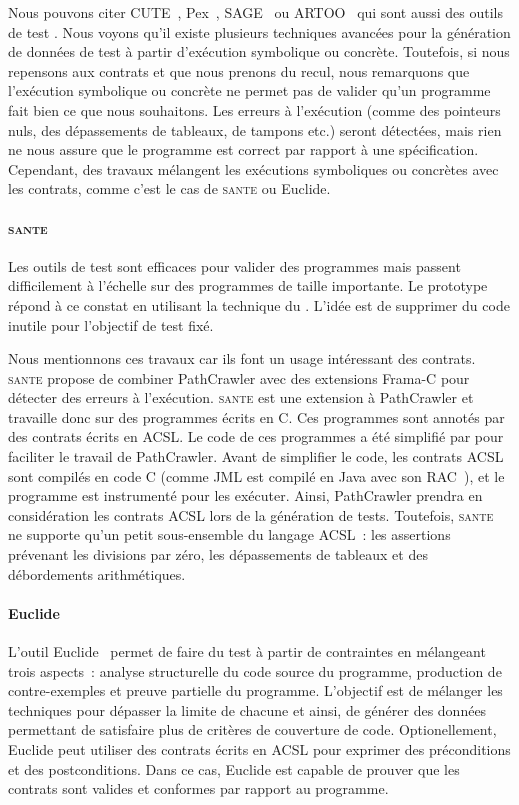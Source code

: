 Nous pouvons citer CUTE~, Pex~,
SAGE~ ou ARTOO~ qui sont aussi des outils
de test . Nous voyons qu'il existe plusieurs techniques
avancées pour la génération de données de test à partir d'exécution symbolique
ou concrète. Toutefois, si nous repensons aux contrats et que nous prenons du
recul, nous remarquons que l'exécution symbolique ou concrète ne permet pas de
valider qu'un programme fait bien ce que nous souhaitons. Les erreurs à
l'exécution (comme des pointeurs nuls, des dépassements de tableaux, de tampons
etc.) seront détectées, mais rien ne nous assure que le programme est correct
par rapport à une spécification. Cependant, des travaux mélangent les exécutions
symboliques ou concrètes avec les contrats, comme c'est le cas de {\scshape
sante} ou Euclide.

\paragraph{\scshape sante} Les outils de test  sont
efficaces pour valider des programmes mais passent difficilement à l'échelle sur
des programmes de taille importante. Le prototype~~ répond à ce constat en utilisant la technique du
. L'idée est de supprimer du code inutile pour l'objectif de
test fixé.

Nous mentionnons ces travaux car ils font un usage intéressant des contrats.
{\scshape sante} propose de combiner PathCrawler avec des extensions Frama-C
pour détecter des erreurs à l'exécution. {\scshape sante} est une extension à
PathCrawler et travaille donc sur des programmes écrits en C. Ces programmes
sont annotés par des contrats écrits en ACSL. Le code de ces programmes a été
simplifié par  pour faciliter le travail de
PathCrawler. Avant de simplifier le code, les contrats ACSL sont compilés en
code C (comme JML est compilé en Java avec son RAC~), et le
programme est instrumenté pour les exécuter. Ainsi, PathCrawler prendra en
considération les contrats ACSL lors de la génération de tests. Toutefois,
{\scshape sante} ne supporte qu'un petit sous-ensemble du langage ACSL~: les
assertions prévenant les divisions par zéro, les dépassements de tableaux et des
débordements arithmétiques.

\paragraph{Euclide} L'outil Euclide~ permet de faire du test à
partir de contrain\-tes en mélangeant trois aspects~: analyse structurelle du
code source du programme, production de contre-exemples et preuve partielle du
programme. L'objectif est de mélanger les techniques pour dépasser la limite de
chacune et ainsi, de générer des données permettant de satisfaire plus de
critères de couverture de code. Optionellement, Euclide peut utiliser des
contrats écrits en ACSL pour exprimer des préconditions et des postconditions.
Dans ce cas, Euclide est capable de prouver que les contrats sont valides et
conformes par rapport au programme.


